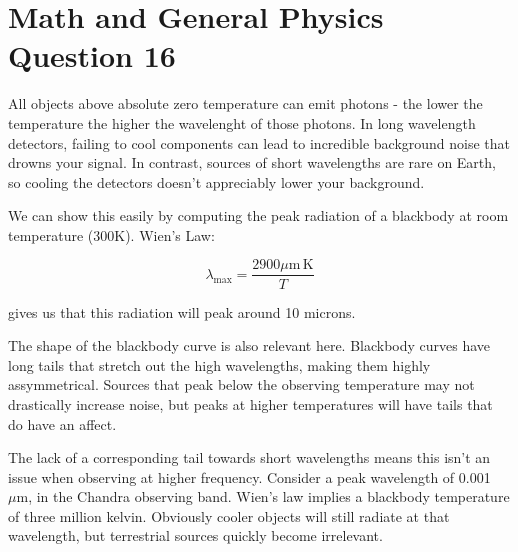 \documentclass[a4paper,11pt]{scrartcl}
\begin{document}
\section{Math and General Physics Question 16}

All objects above absolute zero temperature can emit photons - the lower the temperature the higher the wavelenght of those photons. In long wavelength detectors, failing to cool components can lead to incredible background noise that drowns your signal. In contrast, sources of short wavelengths are rare on Earth, so cooling the detectors doesn't appreciably lower your background.

We can show this easily by computing the peak radiation of a blackbody at room temperature (300K). Wien's Law:

\begin{equation}
\lambda_{\mathrm{max}} = \frac{2900 \mu \mathrm{m} \, \mathrm{K}}{T}
\end{equation}

gives us that this radiation will peak around 10 microns.

The shape of the blackbody curve is also relevant here. Blackbody curves have long tails that stretch out the high wavelengths, making them highly assymmetrical. Sources that peak below the observing temperature may not drastically increase noise, but peaks at higher temperatures will have tails that do have an affect.

The lack of a corresponding tail towards short wavelengths means this isn't an issue when observing at higher frequency. Consider a peak wavelength of 0.001 $\mu\mathrm{m}$, in the Chandra observing band. Wien's law implies a blackbody temperature of three million kelvin. Obviously cooler objects will still radiate at that wavelength, but terrestrial sources quickly become irrelevant.
\end{document}
